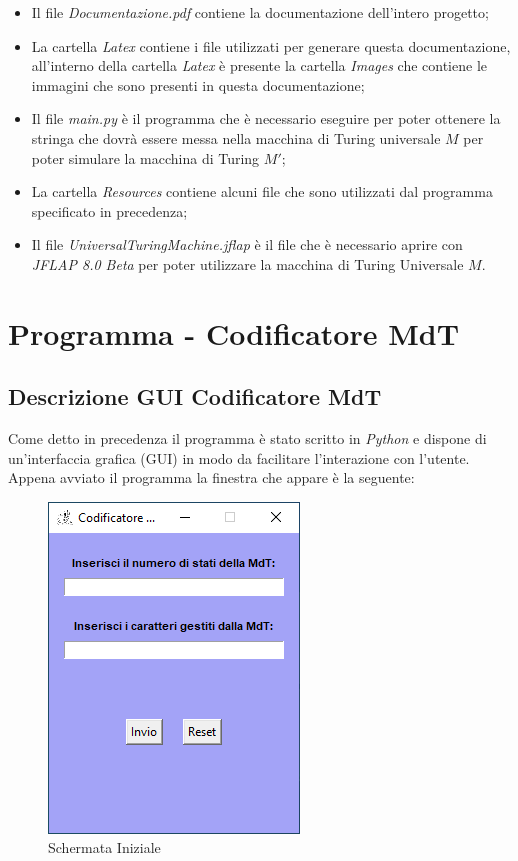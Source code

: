 \documentclass[a4paper,12pt,titlepage,oneside]{book}
\begin{document}
\begin{itemize}
	\item Il file \emph{Documentazione.pdf} contiene la documentazione dell'intero progetto;
	\item La cartella \emph{Latex} contiene i file utilizzati per generare questa documentazione, all'interno della cartella \emph{Latex} è presente la cartella \emph{\foreignlanguage{english}{Images}} che contiene le immagini che sono presenti in questa documentazione;
	\item Il file \emph{\foreignlanguage{english}{main.py}} è il programma che è necessario eseguire per poter ottenere la stringa che dovrà essere messa nella macchina di Turing universale $M$ per poter simulare la macchina di Turing $M'$;
	\item La cartella \emph{\foreignlanguage{english}{Resources}} contiene alcuni file che sono utilizzati dal programma specificato in precedenza;
	\item Il file \emph{\foreignlanguage{english}{UniversalTuringMachine.jflap}} è il file che è necessario aprire con\\ \emph{JFLAP 8.0 Beta} per poter utilizzare la macchina di Turing Universale $M$.
\end{itemize}	

	\chapter{Programma - Codificatore \foreignlanguage{english}{MdT}}\label{Capitolo 3}
		\section{Descrizione GUI Codificatore \foreignlanguage{english}{MdT}}
	
Come detto in precedenza il programma è stato scritto in \emph{\foreignlanguage{english}{Python}} e dispone di un'interfaccia grafica (GUI) in modo da facilitare l'interazione con l'utente.
Appena avviato il programma la finestra che appare è la seguente:

\begin{figure}[!htpb]
	\centering
	\includegraphics[width=.3\textwidth]{Images/schermata_iniziale.png}
	\caption{Schermata Iniziale}
	\label{fig:schermata_iniziale}
\end{figure}
\end{document}
